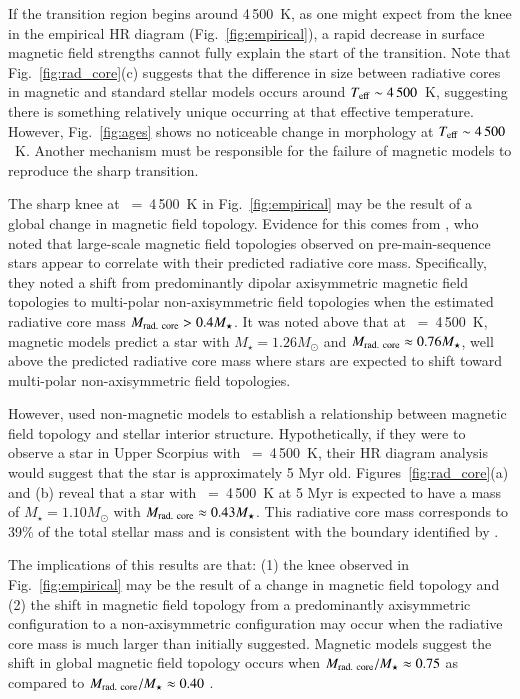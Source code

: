 \documentclass{aa}
\begin{document}
If the transition region begins around 4\,500~K, as one might expect from the knee in the empirical HR diagram (Fig.~\ref{fig:empirical}), a rapid decrease in surface magnetic field strengths cannot fully explain the start of the transition. Note that Fig.~\ref{fig:rad_core}(c) suggests that the difference in size between radiative cores in magnetic and standard stellar models occurs around $T_{\rm eff} \sim 4\,500$~K, suggesting there is something relatively unique occurring at that effective temperature. However, Fig.~\ref{fig:ages} shows no noticeable change in morphology at  $T_{\rm eff} \sim 4\,500$~K. Another mechanism must be responsible for the failure of magnetic models to reproduce the sharp transition.

The sharp knee at \teff~=~4\,500~K in Fig.~\ref{fig:empirical} may be the result of a global change in magnetic field topology. Evidence for this comes from \citet{Gregory2012}, who noted that large-scale magnetic field topologies observed on pre-main-sequence stars appear to correlate with their predicted radiative core mass. Specifically, they noted a shift from predominantly dipolar axisymmetric magnetic field topologies to multi-polar non-axisymmetric field topologies when the estimated radiative core mass $M_{\rm rad.\ core} > 0.4 M_\star$. It was noted above that at \teff~=~4\,500~K, magnetic models predict a star with $M_{\star} = 1.26 M_{\odot}$ and $M_{\rm rad.\ core} \approx 0.76 M_{\star}$, well above the predicted radiative core mass where stars are expected to shift toward multi-polar non-axisymmetric field topologies.

However, \citet{Gregory2012} used non-magnetic models \citep{Siess2000} to establish a relationship between magnetic field topology and stellar interior structure. Hypothetically, if they were to observe a star in Upper Scorpius with \teff~=~4\,500~K, their HR diagram analysis would suggest that the star is approximately 5 Myr old. Figures~\ref{fig:rad_core}(a) and (b) reveal that a star with \teff~=~4\,500~K at 5 Myr is expected to have a mass of $M_{\star} = 1.10 M_{\odot}$ with $M_{\rm rad.\ core} \approx 0.43 M_{\star}$. This radiative core mass corresponds to 39\% of the total stellar mass and is consistent with the boundary identified by \citet{Gregory2012}.

The implications of this results are that: (1) the knee observed in Fig.~\ref{fig:empirical} may be the result of a change in magnetic field topology and (2) the shift in magnetic field topology from a predominantly axisymmetric configuration to a non-axisymmetric configuration may occur when the radiative core mass is much larger than initially suggested. Magnetic models suggest the shift in global magnetic field topology occurs when $M_{\rm rad.\ core} / M_{\star} \approx 0.75$ as compared to $M_{\rm rad.\ core} / M_{\star} \approx 0.40$ \citep{Gregory2012}.
\end{document}

